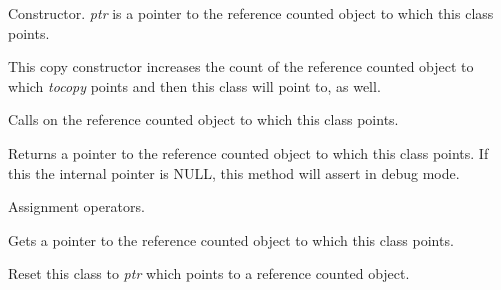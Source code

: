 \label{wxobjectdataptrwxobjectdataptr}


Constructor. {\it ptr} is a pointer to the reference
counted object to which this class points.


This copy constructor increases the count of the reference
counted object to which {\it tocopy} points and then this
class will point to, as well.

\label{wxobjectdataptrdtor}


Calls  on the reference
counted object to which this class points.

\label{wxobjectdataptroperatorpointer}


Returns a pointer to the reference counted object to which
this class points. If this the internal pointer is NULL,
this method will assert in debug mode.

\label{wxobjectdataptroperatorassign}



Assignment operators.

\label{wxobjectdataptrget}


Gets a pointer to the reference counted object to which
this class points.

\label{wxobjectdataptrreset}


Reset this class to {\it ptr} which points to a reference
counted object.
